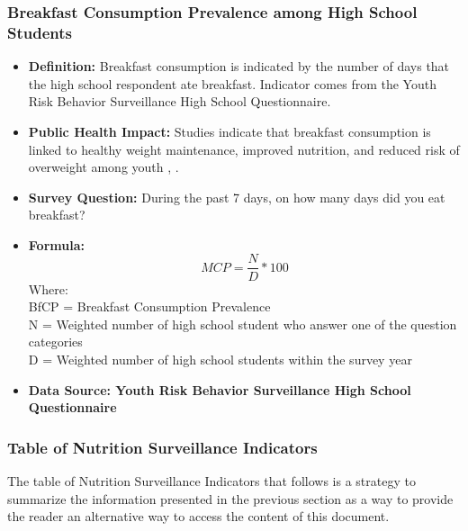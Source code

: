 \documentclass[12pt,letterpaper]{report}
\begin{document}
		\subsubsection{Breakfast Consumption Prevalence among High School Students} 
	\begin{itemize}
		\item \textbf{Definition:} Breakfast consumption is indicated by the number of days that the high school respondent ate breakfast. Indicator comes from the Youth Risk Behavior Surveillance High School Questionnaire.
		\item \textbf{Public Health Impact:}  Studies indicate that breakfast consumption is linked to healthy weight maintenance, improved nutrition, and reduced risk of overweight among youth \cite{timlin2008breakfast}, \cite{barton2005relationship}.
		\item \textbf{Survey Question:} During the past 7 days, on how many days did you eat breakfast?
		\item \textbf{Formula:} 
			\begin{equation}
				MCP = \frac{N}{D} *100
			\end{equation}
Where: \\
			BfCP = Breakfast Consumption Prevalence \\
			
			N = Weighted number of high school student who answer one of the question categories\\
			
			D = Weighted number of high school students within the survey year \\
			
		\item \textbf{Data Source: Youth Risk Behavior Surveillance High School Questionnaire}
	\end{itemize}
	
	\subsubsection{Table of Nutrition Surveillance Indicators}
	
	The table of Nutrition Surveillance Indicators that follows is a strategy to summarize the information presented in the previous section as a way to provide the reader an alternative way to access the content of this document.
	
\newpage
\end{document}
